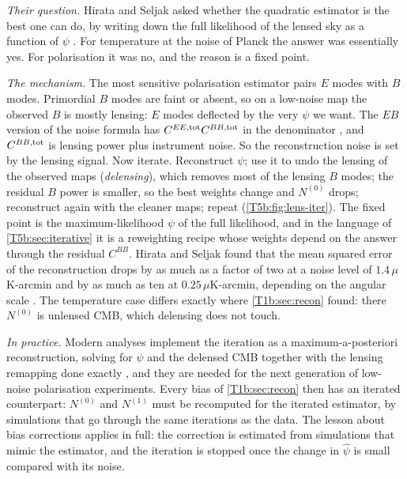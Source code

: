 \emph{Their question.} Hirata and Seljak asked whether the quadratic estimator
is the best one can do, by writing down the full likelihood of the lensed
sky as a function of $\psi$ \cite{HirataSeljak2003T,HirataSeljak2003P}. For
temperature at the noise of Planck the answer was essentially yes. For
polarisation it was no, and the reason is a fixed point.

\emph{The mechanism.} The most sensitive polarisation estimator pairs $E$
modes with $B$ modes. Primordial $B$ modes are faint or absent, so on a
low-noise map the observed $B$ is mostly lensing: $E$ modes deflected by the
very $\psi$ we want. The $EB$ version of the noise formula has
$C^{EE,\rm tot}C^{BB,\rm tot}$ in the denominator \cite{HuOkamoto2002}, and
$C^{BB,\rm tot}$ is lensing power plus instrument noise. So the reconstruction
noise is set by the lensing signal. Now iterate. Reconstruct $\psi$; use it to
undo the lensing of the observed maps (\emph{delensing}), which removes most
of the lensing $B$ modes; the residual $B$ power is smaller, so the best
weights change and $N^{(0)}$ drops; reconstruct again with the cleaner
maps; repeat (\cref{T5b:fig:lens-iter}). The fixed point is the
maximum-likelihood $\psi$ of the full likelihood, and in the language of
\cref{T5b:sec:iterative} it is a reweighting recipe whose weights depend on the
answer through the residual $C^{BB}$. Hirata and Seljak found that the mean
squared error of the reconstruction drops by as much as a factor of two at a
noise level of $1.4\,\mu$K-arcmin and by as much as ten at $0.25\,\mu$K-arcmin,
depending on the angular scale
\cite{HirataSeljak2003P}. The temperature case differs exactly where
\cref{T1b:sec:recon} found: there $N^{(0)}$ is unlensed CMB, which delensing does
not touch.

\emph{In practice.} Modern analyses implement the iteration as a
maximum-a-posteriori reconstruction, solving for $\psi$ and the delensed
CMB together with the lensing remapping done exactly
\cite{CarronLewis2017}, and they are needed for the next generation of
low-noise polarisation experiments. Every bias of \cref{T1b:sec:recon} then
has an iterated counterpart: $N^{(0)}$ and $N^{(1)}$ must be recomputed for the
iterated estimator, by simulations that go through the same iterations as
the data. The lesson about bias corrections applies in full: the correction is
estimated from simulations that mimic the estimator, and the iteration is
stopped once the change in $\hat\psi$ is small compared with its noise.

